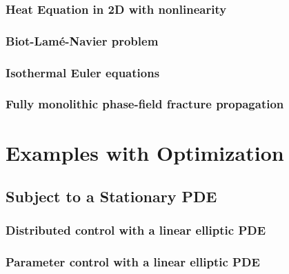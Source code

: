 \documentclass[a4paper,cleardoubleempty]{scrreprt}
\theoremstyle{plain}
\theoremstyle{remark}
\begin{document}
\subsection{Heat Equation in 2D with nonlinearity}
\label{PDE_Instat_Heat_2D}

\clearpage
\subsection{Biot-Lam\'e-Navier problem}
\label{PDE_Instat_biot_lame_navier}

\cleardoublepage
\subsection{Isothermal Euler equations}
\label{PDE_isothermal_euler}

\cleardoublepage
\subsection{Fully monolithic phase-field fracture propagation}
\label{PDE_phase_field_fracture}

\cleardoublepage
\chapter{Examples with Optimization}
\label{OPT}
\section{Subject to a Stationary PDE}
\label{OPT_Stat}
\subsection{Distributed control with a linear elliptic PDE}
\label{OPT_Stat_Distrib_Lin_Ellipt}

\clearpage
\subsection{Parameter control with a linear elliptic PDE}
\label{OPT_Stat_Param_Lin_Ellipt}

\clearpage
\end{document}
